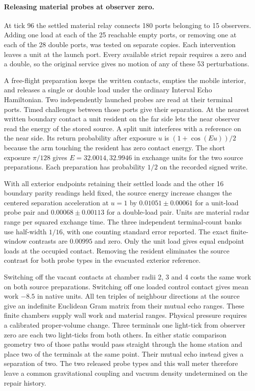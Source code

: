 \documentclass[11pt]{article}
\theoremstyle{remark}
\theoremstyle{plain}
\begin{document}
\paragraph{Releasing material probes at observer zero.}
At tick 96 the settled material relay connects 180 ports belonging to
15 observers. Adding one load at each of the 25 reachable empty ports,
or removing one at each of the 28 double ports, was tested on separate
copies. Each intervention leaves a unit at the launch port. Every
available strict repair requires a zero and a double, so the original
service gives no motion of any of these 53 perturbations.

A free-flight preparation keeps the written contacts, empties the mobile
interior, and releases a single or double load under the ordinary Interval
Echo Hamiltonian. Two independently launched probes are read at their
terminal ports. Timed challenges between those ports give their separation.
At the nearest written boundary contact a unit resident on the far side
lets the near observer read the energy of the stored source. A split
unit interferes with a reference on the near side. Its return probability
after exposure $u$ is $(1+\cos(Eu))/2$ because the arm touching the
resident has zero contact energy. The short exposure $\pi/128$ gives
$E=32.0014,32.9946$ in exchange units for the two source preparations.
Each preparation has probability $1/2$ on the recorded signed write.

With all exterior endpoints retaining their settled loads and the other
16 boundary parity readings held fixed, the source energy increase changes
the centered separation acceleration at $u=1$ by
$0.01051\pm0.00061$ for a unit-load probe pair and
$0.00068\pm0.00113$ for a double-load pair. Units are material radar
range per squared exchange time. The three independent terminal-count
banks use half-width $1/16$, with one counting standard error reported.
The exact finite-window contrasts are $0.00995$ and zero. Only the unit
load gives equal endpoint loads at the occupied contact. Removing the
resident eliminates the source contrast for both probe types in the
evacuated exterior reference.

Switching off the vacant contacts at chamber radii 2, 3 and 4 costs the
same work on both source preparations. Switching off one loaded control
contact gives mean work $-8.5$ in native units. All ten triples of
neighbour directions at the source give an indefinite Euclidean Gram
matrix from their mutual echo ranges. These finite chambers supply
wall work and material ranges. Physical pressure requires a calibrated
proper-volume change. Three terminals one light-tick from observer zero
are each two light-ticks from both others. In either static comparison
geometry two of those paths would pass straight through the home station
and place two of the terminals at the same point. Their mutual echo
instead gives a separation of two. The two released probe types and this wall meter
therefore leave a common gravitational coupling and vacuum density
undetermined on the repair history.
\end{document}
